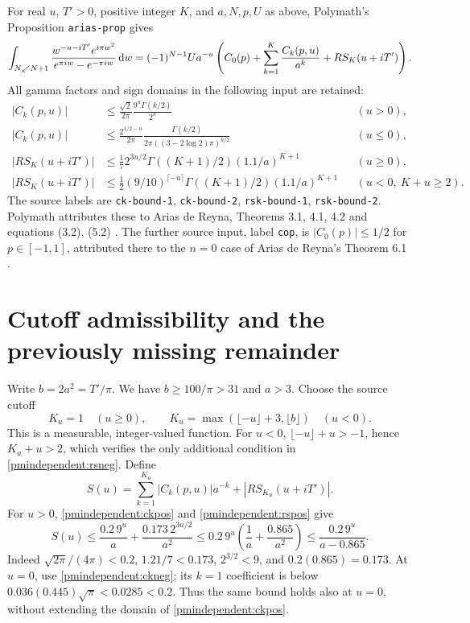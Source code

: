 \documentclass[11pt]{article}
\begin{document}
For real $u$, $T'>0$, positive integer $K$, and $a,N,p,U$ as above,
Polymath's Proposition \texttt{arias-prop} gives
\begin{equation}\label{pmindependent:RSexp}
 \int_{N\swarrow N+1}\frac{w^{-u-iT'}e^{i\pi w^2}}
 {e^{\pi iw}-e^{-\pi iw}}\,\mathrm d w
 =(-1)^{N-1}Ua^{-u}
 \left(C_0(p)+\sum_{k=1}^K\frac{C_k(p,u)}{a^k}+RS_K(u+iT')\right).
\end{equation}
All gamma factors and sign domains in the following input are retained:
\begin{align}
 |C_k(p,u)|&\le\frac{\sqrt2}{2\pi}
                      \frac{9^u\Gamma(k/2)}{2^k} &&(u>0),\label{pmindependent:ckpos}\\
 |C_k(p,u)|&\le\frac{2^{1/2-u}}{2\pi}
       \frac{\Gamma(k/2)}{2\pi((3-2\log2)\pi)^{k/2}} &&(u\le0),\label{pmindependent:ckneg}\\
 |RS_K(u+iT')|&\le\frac17 2^{3u/2}
                         \Gamma((K+1)/2)(1.1/a)^{K+1} &&(u\ge0),\label{pmindependent:rspos}\\
 |RS_K(u+iT')|&\le\frac12(9/10)^{\lceil-u\rceil}
                   \Gamma((K+1)/2)(1.1/a)^{K+1}
                          &&(u<0,\ K+u\ge2).\label{pmindependent:rsneg}
\end{align}
The source labels are \texttt{ck-bound-1}, \texttt{ck-bound-2},
\texttt{rsk-bound-1}, \texttt{rsk-bound-2}. Polymath attributes these
to Arias de Reyna, Theorems 3.1, 4.1, 4.2 and equations (3.2), (5.2)
\cite{pmindependent:arias}. The further source input, label \texttt{cop}, is
$|C_0(p)|\le1/2$ for $p\in[-1,1]$, attributed there to the $n=0$
case of Arias de Reyna's Theorem 6.1 \cite{pmindependent:polymath,pmindependent:arias}.

\section{Cutoff admissibility and the previously missing remainder}

Write $b=2a^2=T'/\pi$. We have $b\ge100/\pi>31$ and $a>3$.
Choose the source cutoff
\[
 K_u=1\quad(u\ge0),\qquad
 K_u=\max(\lfloor-u\rfloor+3,\lfloor b\rfloor)\quad(u<0).
\]
This is a measurable, integer-valued function. For $u<0$,
$\lfloor-u\rfloor+u>-1$, hence $K_u+u>2$, which verifies
the only additional condition in \eqref{pmindependent:rsneg}. Define
\[
 S(u)=\sum_{k=1}^{K_u}|C_k(p,u)|a^{-k}+|RS_{K_u}(u+iT')|.
\]
For $u>0$, \eqref{pmindependent:ckpos} and \eqref{pmindependent:rspos} give
\[
 S(u)\le\frac{0.2\,9^u}{a}+\frac{0.173\,2^{3u/2}}{a^2}
 \le0.2\,9^u\left(\frac1a+\frac{0.865}{a^2}\right)
 \le\frac{0.2\,9^u}{a-0.865}.
\]
Indeed $\sqrt{2\pi}/(4\pi)<0.2$, $1.21/7<0.173$,
$2^{3/2}<9$, and $0.2(0.865)=0.173$.
At $u=0$, use \eqref{pmindependent:ckneg}; its $k=1$ coefficient is below
$0.036(0.445)\sqrt\pi<0.0285<0.2$. Thus the same bound holds
also at $u=0$, without extending the domain of \eqref{pmindependent:ckpos}.
\end{document}
